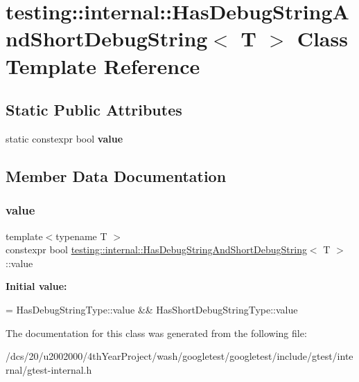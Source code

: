 \hypertarget{classtesting_1_1internal_1_1HasDebugStringAndShortDebugString}{}\section{testing\+:\+:internal\+:\+:Has\+Debug\+String\+And\+Short\+Debug\+String$<$ T $>$ Class Template Reference}
\label{classtesting_1_1internal_1_1HasDebugStringAndShortDebugString}
\subsection*{Static Public Attributes}
\begin{DoxyCompactItemize}
\item 
static constexpr bool {\bfseries value}
\end{DoxyCompactItemize}


\subsection{Member Data Documentation}
\mbox{\label{classtesting_1_1internal_1_1HasDebugStringAndShortDebugString_abb97a0cc14c348c235173472b4d111ad}} 
\subsubsection{\texorpdfstring{value}{value}}
{\footnotesize\ttfamily template$<$typename T $>$ \\
constexpr bool \mbox{\hyperlink{classtesting_1_1internal_1_1HasDebugStringAndShortDebugString}{testing\+::internal\+::\+Has\+Debug\+String\+And\+Short\+Debug\+String}}$<$ T $>$\+::value\hspace{0.3cm}{\ttfamily [static]}}

{\bfseries Initial value\+:}
\begin{DoxyCode}
=
      HasDebugStringType::value && HasShortDebugStringType::value
\end{DoxyCode}


The documentation for this class was generated from the following file\+:\begin{DoxyCompactItemize}
\item 
/dcs/20/u2002000/4th\+Year\+Project/wash/googletest/googletest/include/gtest/internal/gtest-\/internal.\+h\end{DoxyCompactItemize}
